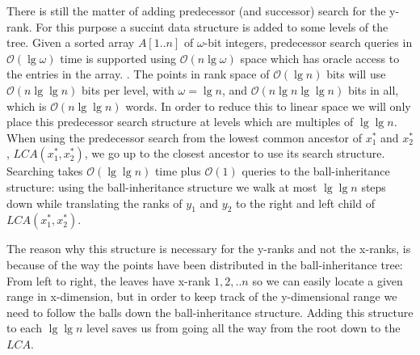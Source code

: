 There is still the matter of adding predecessor (and successor) search for the y-rank.
For this purpose a succint data structure is added to some levels of the tree. Given a sorted array $A[1..n]$ of $\omega$-bit integers, predecessor search queries in $\mathcal{O}(\lg \omega)$ time is supported using $\mathcal{O}(n \lg \omega)$ space which has oracle access to the entries in the array. . The points in rank space of $\mathcal{O}(\lg n)$ bits will use $\mathcal{O}(n \lg \lg n)$ bits per level, with $\omega = \lg n$, and $\mathcal{O}(n \lg n \lg \lg n)$ bits in all, which is $\mathcal{O}(n \lg \lg n)$ words. In order to reduce this to linear space we will only place this predecessor search structure at levels which are multiples of $\lg \lg n$. When using the predecessor search from the lowest common ancestor of $x^*_1$ and $x^*_2$, $LCA(x^*_1, x^*_2)$, we go up to the closest ancestor to use its search structure. Searching takes $\mathcal{O}(\lg \lg n)$ time plus $\mathcal{O}(1)$ queries to the ball-inheritance structure: using the ball-inheritance structure we walk at most $\lg \lg n$ steps down while translating the ranks of $y_1$ and $y_2$ to the right and left child of $LCA(x^*_1, x^*_2)$. 

The reason why this structure is necessary for the y-ranks and not the x-ranks, is because of the way the points have been distributed in the ball-inheritance tree: From left to right, the leaves have x-rank $1,2,..n$ so we can easily locate a given range in x-dimension, but in order to keep track of the y-dimensional range we need to follow the balls down the ball-inheritance structure. Adding this structure to each $\lg \lg n$ level saves us from going all the way from the root down to the $LCA$.  \\

